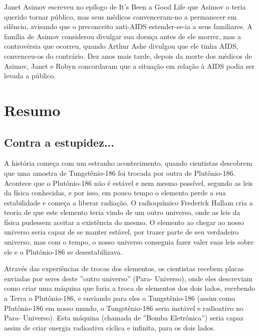 \documentclass[14pt,portuguese]{extreport}
\begin{document}
      Janet Asimov escreveu no epílogo de It's Been a Good Life que
      Asimov o teria querido tornar público, mas seus médicos
      convenceram-no a permanecer em silêncio, avisando que o
      preconceito anti-AIDS estender-se-ia a seus familiares. A família de
      Asimov considerou divulgar sua doença antes de ele morrer, mas a
      controvérsia que ocorreu, quando Arthur Ashe divulgou que ele
      tinha AIDS, convenceu-os do contrário. Dez anos mais tarde, depois
      da morte dos médicos de Asimov, Janet e Robyn concordaram que a
      situação em relação à AIDS podia ser levada a público.
      
  \chapter{Resumo}

    \section{Contra a estupidez...}
    
      A história começa com um estranho acontecimento, quando
      cientistas descobrem que uma amostra de Tungstênio-186 foi trocada
      por outra de Plutônio-186. Acontece que o Plutônio-186 não é estável e
      nem mesmo possível, segundo as leis da física conhecidas, e por isso, em
      pouco tempo o elemento perde a sua estabilidade e começa a liberar
      radiação. O radioquímico Frederick Hallam cria a teoria de que este
      elemento teria vindo de um outro universo, onde as leis da física
      pudessem aceitar a existência do mesmo. O elemento ao chegar ao
      nosso universo seria capaz de se manter estável, por trazer parte de seu
      verdadeiro universo, mas com o tempo, o nosso universo conseguia
      fazer valer suas leis sobre ele e o Plutônio-186 se desestabilizava.
      
      Através das experiências de trocas dos elementos, os cientistas
      recebem placas enviadas por seres deste ”outro universo” (Para-
      Universo), onde eles descreviam como criar uma máquina que faria a
      troca de elementos dos dois lados, recebendo a Terra o Plutônio-186, e
      enviando para eles o Tungstênio-186 (assim como Plutônio-186 em
      nosso mundo, o Tungstênio-186 seria instável e radioativo no Para-
      Universo). Esta máquina (chamada de ”Bomba Eletrônica”) seria capaz
      assim de criar energia radioativa cíclica e infinita, para os dois lados.
      
\end{document}
